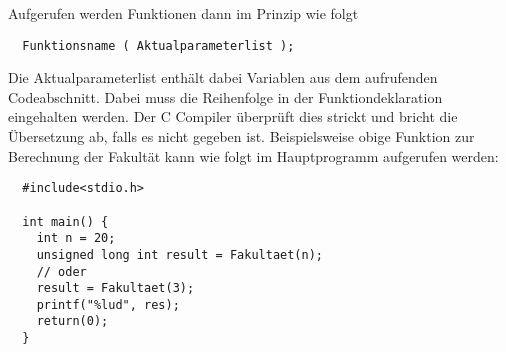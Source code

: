 Aufgerufen werden Funktionen dann im Prinzip wie folgt
\begin{lstlisting}
  Funktionsname ( Aktualparameterlist );
\end{lstlisting}
Die Aktualparameterlist enthält dabei Variablen aus dem aufrufenden Codeabschnitt.
Dabei muss die Reihenfolge in der Funktiondeklaration eingehalten werden.
Der C Compiler überprüft dies strickt und bricht die Übersetzung ab, falls es nicht gegeben ist.
Beispielsweise obige Funktion zur Berechnung der Fakultät kann wie folgt im Hauptprogramm aufgerufen werden:
\begin{lstlisting}
  #include<stdio.h>

  int main() {
    int n = 20;
    unsigned long int result = Fakultaet(n);
    // oder
    result = Fakultaet(3);
    printf("%lud", res);
    return(0);
  }
\end{lstlisting}

\endinput
